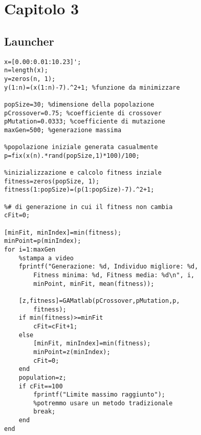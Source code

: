 
\appendix
{}
\section{Capitolo 3}
\subsection{Launcher}
\begin{lstlisting}[style=matlab, style=matlab2, style=matlab3]
x=[0.00:0.01:10.23]';
n=length(x);
y=zeros(n, 1);
y(1:n)=(x(1:n)-7).^2+1; %funzione da minimizzare

popSize=30; %dimensione della popolazione
pCrossover=0.75; %coefficiente di crossover
pMutation=0.0333; %coefficiente di mutazione
maxGen=500; %generazione massima

%popolazione iniziale generata casualmente
p=fix(x(n).*rand(popSize,1)*100)/100;

%inizializzazione e calcolo fitness inziale
fitness=zeros(popSize, 1);
fitness(1:popSize)=(p(1:popSize)-7).^2+1;

%# di generazione in cui il fitness non cambia
cFit=0;

[minFit, minIndex]=min(fitness);
minPoint=p(minIndex);
for i=1:maxGen
    %stampa a video
    fprintf("Generazione: %d, Individuo migliore: %d, 
        Fitness minima: %d, Fitness media: %d\n", i, 
        minPoint, minFit, mean(fitness));
    
    [z,fitness]=GAMatlab(pCrossover,pMutation,p,
        fitness);
    if min(fitness)>=minFit
        cFit=cFit+1;
    else
        [minFit, minIndex]=min(fitness);
        minPoint=z(minIndex);
        cFit=0;
    end
    population=z;
    if cFit==100
        fprintf("Limite massimo raggiunto");
        %potremmo usare un metodo tradizionale
        break; 
    end
end
\end{lstlisting}
